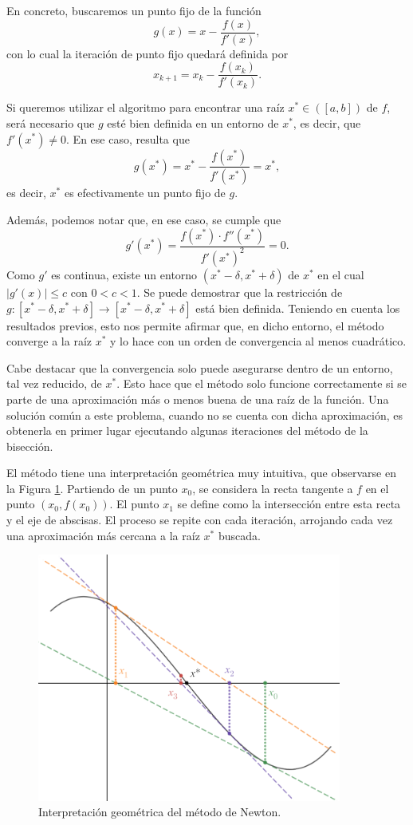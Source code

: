 En concreto, buscaremos un punto fijo de la función
\[ g(x) = x - \frac{f(x)}{f'(x)}, \]
con lo cual la iteración de punto fijo quedará definida por
\[ x_{k+1} = x_k - \frac{f(x_k)}{f'(x_k)}. \]

Si queremos utilizar el algoritmo para encontrar una raíz $x^\ast \in ([a,b])$ de $f$, será necesario que $g$ esté bien definida en un entorno de $x^\ast$, es decir, que $f'(x^\ast) \neq 0$. En ese caso, resulta que
\[ g(x^\ast) = x^\ast - \frac{f(x^\ast)}{f'(x^\ast)} = x^\ast, \]
es decir, $x^\ast$ es efectivamente un punto fijo de $g$.

Además, podemos notar que, en ese caso, se cumple que
\[ g'(x^\ast) = \frac{f(x^\ast) \cdot f''(x^\ast)}{f'(x^\ast)^2} = 0. \]
Como $g'$ es continua, existe un entorno $(x^\ast - \delta, x^\ast + \delta)$ de $x^\ast$ en el cual $\lvert g'(x) \rvert \leq c$ con $0 < c < 1$. Se puede demostrar que la restricción de $g : [x^\ast - \delta, x^\ast + \delta] \to [x^\ast - \delta, x^\ast + \delta]$ está bien definida. Teniendo en cuenta los resultados previos, esto nos permite afirmar que, en dicho entorno, el método converge a la raíz $x^\ast$ y lo hace con un orden de convergencia al menos cuadrático.

Cabe destacar que la convergencia solo puede asegurarse dentro de un entorno,
tal vez reducido, de $x^\ast$. Esto hace que el método solo funcione
correctamente si se parte de una aproximación más o menos buena de una raíz
de la función. Una solución común a este problema, cuando no se cuenta con
dicha aproximación, es obtenerla en primer lugar ejecutando algunas
iteraciones del método de la bisección.

El método tiene una interpretación geométrica muy intuitiva, que 
observarse en la Figura \ref{fig:newton}. Partiendo de un
punto $x_0$, se considera la recta tangente a $f$ en el
punto $(x_0, f(x_0))$. El punto $x_1$ se define como la intersección entre
esta recta y el eje de abscisas. El proceso se repite con cada iteración,
arrojando cada vez una aproximación más cercana a la raíz $x^{\ast}$
buscada.

\begin{figure}[H]
\centering
\includegraphics[width=10cm]{newton.png}
\caption{Interpretación geométrica del método de Newton.}
\label{fig:newton}
\end{figure}

